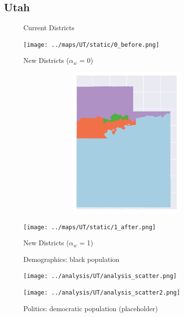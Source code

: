 \subsection{Utah}
\begin{figure}[htb!] \centering
\caption{ Current Districts }
\texttt{[image: ../maps/UT/static/0\_before.png]}
\caption{ New Districts ($\alpha_w$ = 0) }
\includegraphics[width=5in,height=3in,keepaspectratio]{../maps/UT/static/0_after.png}
\caption{ New Districts ($\alpha_w$ = 1) }
\texttt{[image: ../maps/UT/static/1\_after.png]}
\end{figure}

\clearpage
\newpage

\begin{figure}[htb!] \centering
\caption{ Demographics: black population }
\texttt{[image: ../analysis/UT/analysis\_scatter.png]}
\caption{ Politics: democratic population (placeholder)}
\texttt{[image: ../analysis/UT/analysis\_scatter2.png]}
\end{figure}

\clearpage
\newpage

